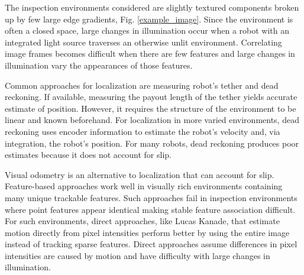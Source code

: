 \documentclass[letterpaper, 10 pt, conference]{ieeeconf}
\begin{document}
The inspection environments considered are slightly textured components broken up by few large edge gradients, Fig. \ref{example_image}. Since the environment is often a closed space, large changes in illumination occur when a robot with an integrated light source traverses an otherwise unlit environment. Correlating image frames becomes difficult when there are few features and large changes in illumination vary the appearances of those features.

Common approaches for localization are measuring robot's tether and dead reckoning. If available, measuring the payout length of the tether yields accurate estimate of position. However, it requires the structure of the environment to be linear and known beforehand. For localization in more varied environments, dead reckoning uses encoder information to estimate the robot's velocity and, via integration, the robot's position. For many robots, dead reckoning produces poor estimates because it does not account for slip.


Visual odometry is an alternative to localization that can account for slip. Feature-based approaches work well in visually rich environments containing many unique trackable features. Such approaches fail in inspection environments where point features appear identical making stable feature association difficult. For such environments, direct approaches, like Lucas Kanade, that estimate motion directly from pixel intensities perform better by using the entire image instead of tracking sparse features. Direct approaches assume differences in pixel intensities are caused by motion and have difficulty with large changes in illumination.
\end{document}

